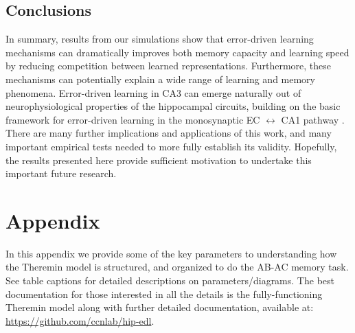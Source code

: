 \documentclass[11pt,twoside]{article}
\newif\myifpdf
\begin{document}
\subsection{Conclusions}

In summary, results from our simulations show that error-driven learning mechanisms can dramatically improves both memory capacity and learning speed by reducing competition between learned representations.  Furthermore, these mechanisms can potentially explain a wide range of learning and memory phenomena.  Error-driven learning in CA3 can emerge naturally out of neurophysiological properties of the hippocampal circuits, building on the basic framework for error-driven learning in the monosynaptic EC $\leftrightarrow$ CA1 pathway \citep{KetzMorkondaOReilly13}.  There are many further implications and applications of this work, and many important empirical tests needed to more fully establish its validity.  Hopefully, the results presented here provide sufficient motivation to undertake this important future research.


\section{Appendix}

In this appendix we provide some of the key parameters to understanding how the Theremin model is structured, and organized to do the AB-AC memory task.  See table captions for detailed descriptions on parameters/diagrams.  The best documentation for those interested in all the details is the fully-functioning Theremin model along with further detailed documentation, available at: \url{https://github.com/ccnlab/hip-edl}.   

\FloatBarrier
\end{document}

